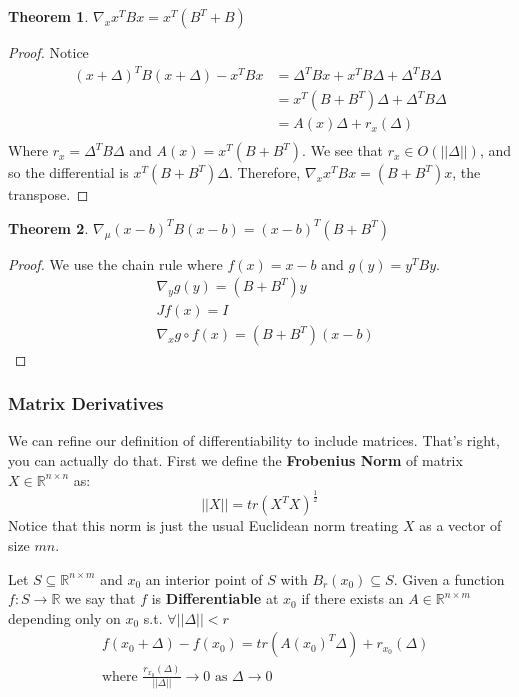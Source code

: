 \documentclass[]{article}
\theoremstyle{mattstyle}
\newtheorem{theorem}{Theorem}[section]
\theoremstyle{definition}
\begin{document}
\begin{theorem}
	$\nabla_{x} x^TBx = x^T(B^T+B)$
\end{theorem}
\begin{proof}
	Notice 
	\begin{align*}
	(x+\Delta)^TB(x+\Delta) - x^TBx &= \Delta^TBx + x^TB\Delta + \Delta^TB\Delta\\
	&= x^T(B + B^T)\Delta + \Delta^TB\Delta\\
	&= A(x)\Delta + r_{x}(\Delta)\\
	\end{align*}
	Where $r_{x}=\Delta^TB\Delta$ and $A(x)=x^T(B + B^T)$. We see that $r_{x}\in O(||\Delta||)$, and so the differential is $x^T(B + B^T)\Delta$. Therefore, $\nabla_x x^TBx = (B + B^T)x$, the transpose.
\end{proof}

\begin{theorem}
	$\nabla_{\mu} (x-b)^TB(x-b) = (x-b)^T(B+B^T)$
\end{theorem}
\begin{proof}
	We use the chain rule where $f(x)=x-b$ and $g(y)=y^TBy$.
	\begin{align*}
	&\nabla_{y}g(y) = (B + B^T)y\\
	&Jf(x) = I \\
	&\nabla_{x} g \circ f(x) = (B + B^T)(x-b)
	\end{align*}
\end{proof}

\subsubsection{Matrix Derivatives}
We can refine our definition of differentiability to include matrices. That's right, you can actually do that. First we define the \textbf{Frobenius Norm} of matrix $X \in \mathbb{R}^{n \times n}$ as:
$$ ||X|| = tr(X^TX)^{\frac{1}{2}} $$
Notice that this norm is just the usual Euclidean norm treating $X$ as a vector of size $mn$. 

Let $S \subseteq \mathbb{R}^{n \times m}$ and $x_0$ an interior point of $S$ with $B_r(x_0) \subseteq S$. Given a function $f: S \rightarrow \mathbb{R}$ we say that $f$ is \textbf{Differentiable} at $x_0$ if there exists an $A \in \mathbb{R}^{n \times m}$ depending only on $x_0$ s.t. $\forall ||\Delta|| < r$
\begin{align*}
&f(x_0 + \Delta) - f(x_0) = tr(A(x_0)^T\Delta) + r_{x_0}(\Delta)\\
&\text{where $\frac{r_{x_0}(\Delta)}{||\Delta||}\rightarrow 0$ as $\Delta \rightarrow 0$}
\end{align*}
\end{document}

